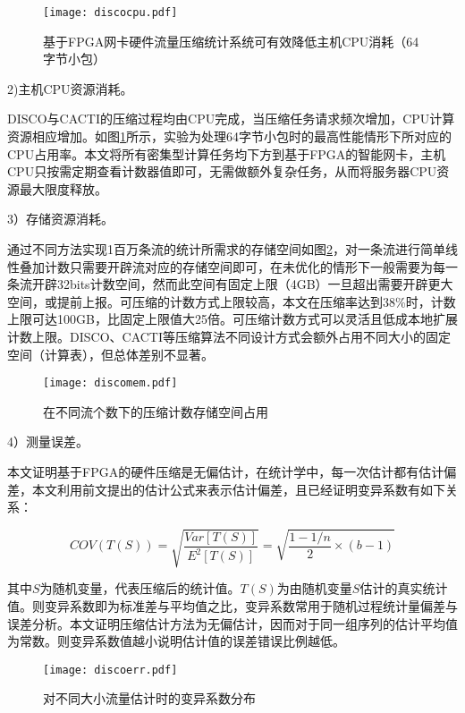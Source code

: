 \begin{figure}[!ht]
	\centering 
	\texttt{[image: discocpu.pdf]}
	\caption{基于FPGA网卡硬件流量压缩统计系统可有效降低主机CPU消耗（64字节小包）} \label{fig:discocpu}
\end{figure}


2)主机CPU资源消耗。

DISCO与CACTI的压缩过程均由CPU完成，当压缩任务请求频次增加，CPU计算资源相应增加。如图\ref{fig:discocpu}所示，实验为处理64字节小包时的最高性能情形下所对应的CPU占用率。本文将所有密集型计算任务均下方到基于FPGA的智能网卡，主机CPU只按需定期查看计数器值即可，无需做额外复杂任务，从而将服务器CPU资源最大限度释放。



3）存储资源消耗。

通过不同方法实现1百万条流的统计所需求的存储空间如图\ref{fig:discomem}，对一条流进行简单线性叠加计数只需要开辟流对应的存储空间即可，在未优化的情形下一般需要为每一条流开辟32bits计数空间，然而此空间有固定上限（4GB）一旦超出需要开辟更大空间，或提前上报。可压缩的计数方式上限较高，本文在压缩率达到38\%时，计数上限可达100GB，比固定上限值大25倍。可压缩计数方式可以灵活且低成本地扩展计数上限。DISCO、CACTI等压缩算法不同设计方式会额外占用不同大小的固定空间（计算表），但总体差别不显著。

\begin{figure}[!ht]
	\centering 
	\texttt{[image: discomem.pdf]}
	\caption{在不同流个数下的压缩计数存储空间占用} \label{fig:discomem}
\end{figure}



4）测量误差。

本文证明基于FPGA的硬件压缩是无偏估计，在统计学中，每一次估计都有估计偏差，本文利用前文提出的估计公式来表示估计偏差，且已经证明变异系数有如下关系：

\begin{equation} \label{mydiscofl}
COV(T(S))=\sqrt{\dfrac{Var[T(S)]}{E^2[T(S)]}}=\sqrt{\dfrac{1-1/n}{2}\times (b-1)}
\end{equation}

其中$ S $为随机变量，代表压缩后的统计值。$ T(S) $为由随机变量$ S $估计的真实统计值。则变异系数即为标准差与平均值之比，变异系数常用于随机过程统计量偏差与误差分析。本文证明压缩估计方法为无偏估计，因而对于同一组序列的估计平均值为常数。则变异系数值越小说明估计值的误差错误比例越低。

\begin{figure}[!ht]
	\centering 
	\texttt{[image: discoerr.pdf]}
	\caption{对不同大小流量估计时的变异系数分布} \label{fig:discoerr}
\end{figure}

